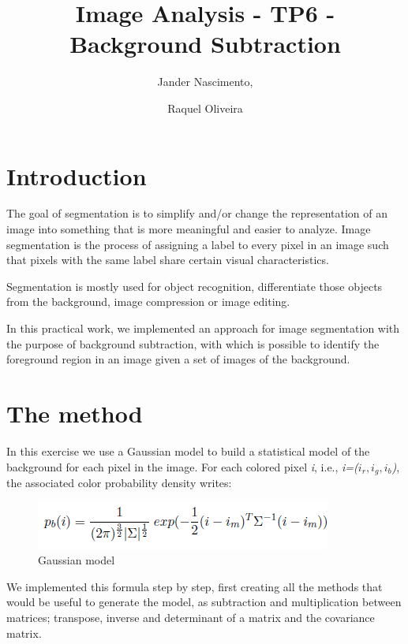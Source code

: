 \documentclass{article}
\begin{document}
\title{Image Analysis - TP6 - Background Subtraction}

\author{Jander Nascimento, 
\and Raquel Oliveira}

\maketitle

\section{Introduction}

The goal of segmentation is to simplify and/or change the representation of an image into something that is more meaningful and easier to analyze. Image segmentation is the process of assigning a label to every pixel in an image such that pixels with the same label share certain visual characteristics.\cite{introduction}

Segmentation is mostly used for object recognition, differentiate those objects from the background, image compression or image editing.

In this practical work, we implemented an approach for image segmentation with the purpose of background subtraction, with which is possible to identify the foreground region in an image given a set of images of the background.


\section{The method}

In this exercise we use a Gaussian model to build a statistical model of the background for each pixel in the image. For each colored pixel \textit{i}, i.e., \textit{i=($i_r, i_g, i_b$)}, the associated color probability density writes:

	\begin{figure} [H]
		\centering
		\includegraphics[scale=0.5]{img/formula}
		\caption{Gaussian model\label{formula}}
	\end{figure}

We implemented this formula step by step, first creating all the methods that would be useful to generate the model, as subtraction and multiplication between matrices; transpose, inverse and determinant of a matrix and the covariance matrix.
\end{document}
